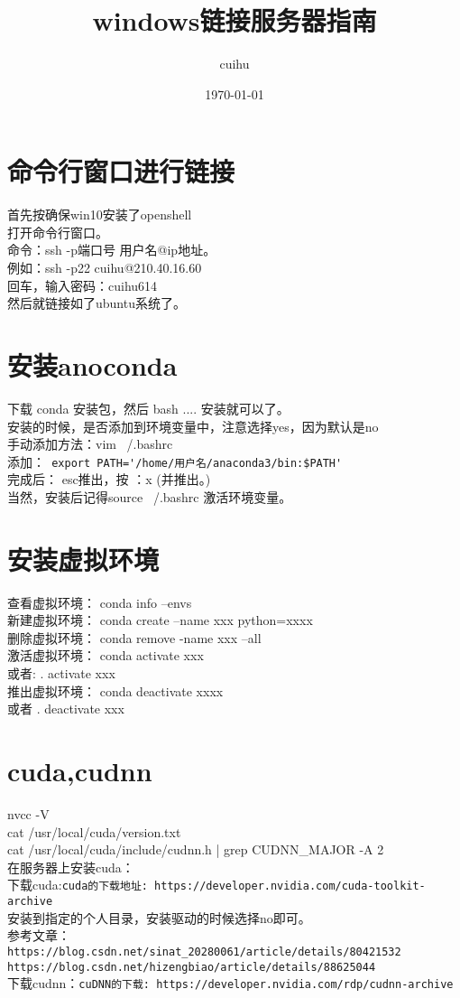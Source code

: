 \documentclass{ctexart}
\title{windows链接服务器指南}
\date{\today}
\author{cuihu}
\begin{document}
	\maketitle
	\section{命令行窗口进行链接}
	首先按确保win10安装了openshell\\
	打开命令行窗口。\\
	命令：ssh -p端口号 用户名@ip地址。\\
	例如：ssh -p22 cuihu@210.40.16.60\\
	回车，输入密码：cuihu614\\
	然后就链接如了ubuntu系统了。\\
	\section{安装anoconda}
	下载 conda 安装包，然后 bash .... 安装就可以了。\\
	安装的时候，是否添加到环境变量中，注意选择yes，因为默认是no\\
	手动添加方法：vim ~/.bashrc\\
	添加：\verb| export PATH='/home/用户名/anaconda3/bin:$PATH'|\\
	完成后： esc推出，按   ：x (并推出。)\\
		当然，安装后记得source ~/.bashrc 激活环境变量。
	\section{安装虚拟环境}
	查看虚拟环境： conda info --envs \\
	新建虚拟环境： conda create --name xxx python=xxxx\\
	删除虚拟环境： conda remove -name xxx --all\\
	激活虚拟环境： conda activate xxx\\
	或者: . activate xxx\\
	推出虚拟环境： conda deactivate xxxx\\
	或者 . deactivate xxx\\
	
	\section{cuda,cudnn}
	nvcc -V\\
	cat /usr/local/cuda/version.txt\\
	 cat /usr/local/cuda/include/cudnn.h | grep CUDNN\_MAJOR -A 2 \\
	在服务器上安装cuda：\\
	下载cuda:\verb|cuda的下载地址: https://developer.nvidia.com/cuda-toolkit-archive|\\
	安装到指定的个人目录，安装驱动的时候选择no即可。\\
	参考文章：
	\verb|https://blog.csdn.net/sinat_20280061/article/details/80421532|\\
	\verb|https://blog.csdn.net/hizengbiao/article/details/88625044|\\
	下载cudnn：\verb|cuDNN的下载: https://developer.nvidia.com/rdp/cudnn-archive|\\
	
\end{document}
